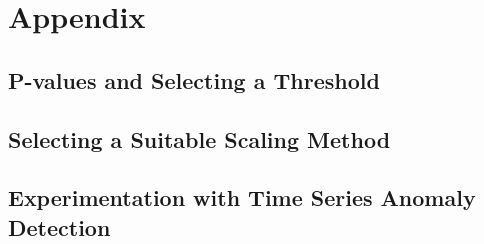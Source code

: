 \documentclass[12pt]{article}
\begin{document}
\section{Appendix}\label{Appendix}

\subsection{P-values and Selecting a Threshold}

\subsection{Selecting a Suitable Scaling Method}

\subsection{Experimentation with Time Series Anomaly Detection}








\end{document}
